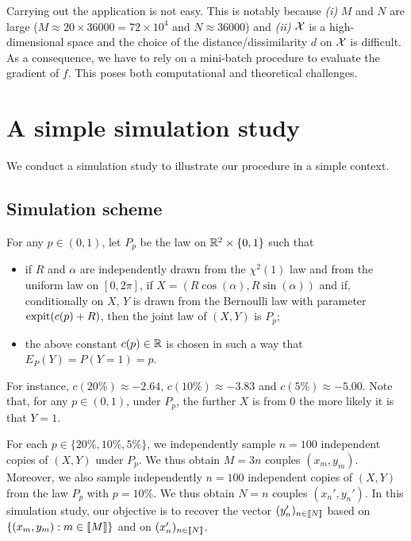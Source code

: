 Carrying out the application is not easy. This is notably because \textit{(i)}
$M$ and  $N$ are  large ($M\approx  20 \times  36000 =  72 \times  10^{4}$ and
$N \approx 36000$)  and \textit{(ii)} $\mathcal{X}$ is a  high-dimensional space and
the choice  of the distance/dissimilarity $d$  on $\mathcal{X}$ is difficult.   As a
consequence,  we have  to  rely  on a  mini-batch  procedure  to evaluate  the
gradient of $f$. This poses both computational and theoretical challenges.


\section{A simple simulation study}
\label{sec:simul}

We conduct a simulation study to illustrate our procedure in a simple context.

\subsection{Simulation scheme}
\label{subsec:sim:scheme}

For any $p\in(0,1)$, let $P_{p}$ be  the law on $\mathbb{R}^{2} \times \{0,1\}$ such
that
\begin{itemize}
\item if $R$  and $\alpha$ are independently drawn from  the $\chi^{2}(1)$ law
  and      from      the      uniform     law      on      $[0,2\pi]$,      if
  $X =  (R\cos(\alpha), R\sin(\alpha))$ and  if, conditionally on $X$,  $Y$ is
  drawn from  the Bernoulli law  with parameter  $\operatorname{expit}(c(p) + R)$,  then the
  joint law of $(X,Y)$ is $P_{p}$;
\item  the above  constant  $c(p) \in  \mathbb{R}$  is  chosen in  such  a way  that
  $E_{P}(Y) = P(Y=1) = p$.
\end{itemize}
For   instance,  $c(20\%)   \approx  -2.64$,   $c(10\%)  \approx   -3.83$  and
$c(5\%) \approx  -5.00$.  Note that,  for any $p\in(0,1)$, under  $P_{p}$, the
further $X$ is from 0 the more likely it is that $Y=1$.

For each $p\in\{20\%, 10\%,5\%\}$, we independently sample $n=100$ independent
copies   of  $(X,Y)$   under   $P_{p}$.   We   thus   obtain  $M=3n$   couples
$(x_{m}, y_{m})$.  Moreover, we  also sample independently $n=100$ independent
copies of  $(X,Y)$ from the law  $P_{p}$ with $p=10\%$.  We  thus obtain $N=n$
couples  $(x_{n}',y_{n}')$.  In  this simulation  study, our  objective is  to
recover    the    vector    $(y_{n}')_{n    \in   \llbracket    N\rrbracket}$    based    on
$\{(x_{m}, y_{m}) : m \in \llbracket M\rrbracket\}$ and on $(x_{n}')_{n \in \llbracket N\rrbracket}$.

